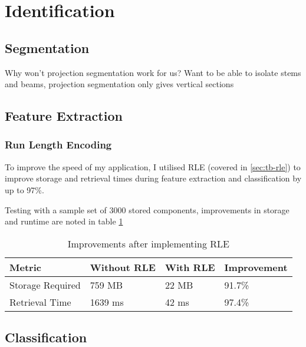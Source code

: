 \section{Identification}


\subsection{Segmentation}

Why won't projection segmentation work for us? Want to be able to isolate stems and beams, projection segmentation only gives vertical sections


\subsection{Feature Extraction}

\subsubsection{Run Length Encoding}
To improve the speed of my application, I utilised \acrfull{RLE} (covered in \cref{sec:tb-rle}) to improve storage and retrieval times during feature extraction and classification by up to 97\%.

Testing with a sample set of 3000 stored components, improvements in storage and runtime are noted in table \cref{table:rle-improvement}

\begin{table}[h]

    \begin{tabularx}{\textwidth}{ X X X X }
    \toprule
    Metric                  & Without RLE   & With RLE   & Improvement \\
    \midrule
    Storage Required        & 759 MB        & 22 MB      & 91.7\%      \\
    Retrieval Time          & 1639 ms       & 42 ms      & 97.4\% \\
    \bottomrule
    \end{tabularx}

    \label{table:rle-improvement}
    \caption{Improvements after implementing RLE}
\end{table}

\subsection{Classification}
\label{sec:implementation-classification}

